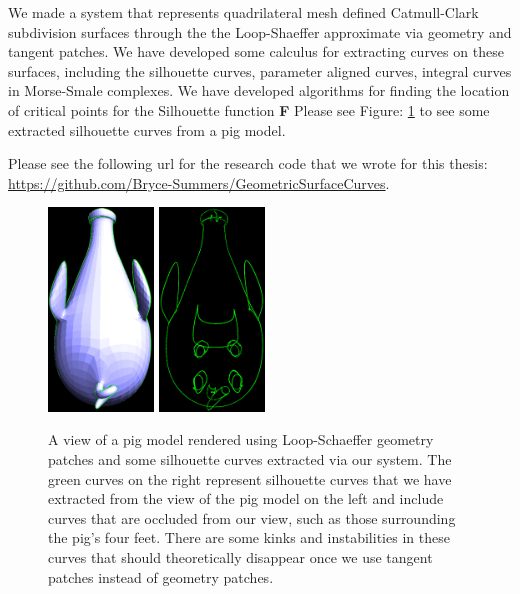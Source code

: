 \documentclass[12pt, letterpaper]{article}
\begin{document}
We made a system that represents quadrilateral mesh defined Catmull-Clark subdivision surfaces through the the Loop-Shaeffer approximate via geometry and tangent patches.
We have developed some calculus for extracting curves on these surfaces, including the silhouette curves, parameter aligned curves, integral curves in
Morse-Smale complexes.
We have developed algorithms for finding the location of critical points for the Silhouette function \textbf{F}
Please see Figure: \ref{fig:pig_silhouettes} to see some extracted silhouette curves from a pig model.

Please see the following url for the research code that we wrote for this thesis: \url{https://github.com/Bryce-Summers/GeometricSurfaceCurves}.

\begin{figure}[h]
\centering
\includegraphics[width=0.25\textwidth]{Pig_patched}
\includegraphics[width=0.25\textwidth]{Pig_silhouettes}
\caption{A view of a pig model rendered using Loop-Schaeffer geometry patches and some silhouette curves extracted via our system.
	The green curves on the right represent silhouette curves that we have extracted from the view of the pig model on the left and include curves that are
	occluded from our view, such as those surrounding the pig's four feet. There are some kinks and instabilities in these curves that should theoretically
	disappear once we use tangent patches instead of geometry patches.}
\label{fig:pig_silhouettes}
\end{figure}
\end{document}
